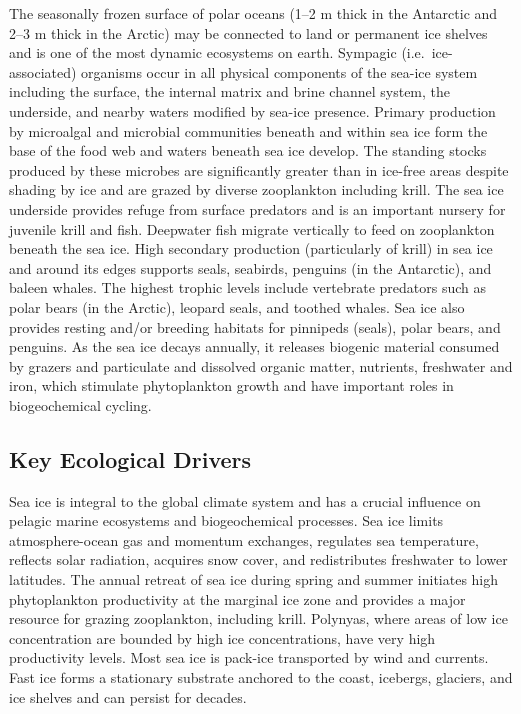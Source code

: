 \documentclass[
  letterpaper,
  DIV=11,
  numbers=noendperiod]{scrartcl}
\begin{document}
The seasonally frozen surface of polar oceans (1--2 m thick in the
Antarctic and 2--3 m thick in the Arctic) may be connected to land or
permanent ice shelves and is one of the most dynamic ecosystems on
earth. Sympagic (i.e.~ice-associated) organisms occur in all physical
components of the sea-ice system including the surface, the internal
matrix and brine channel system, the underside, and nearby waters
modified by sea-ice presence. Primary production by microalgal and
microbial communities beneath and within sea ice form the base of the
food web and waters beneath sea ice develop. The standing stocks
produced by these microbes are significantly greater than in ice-free
areas despite shading by ice and are grazed by diverse zooplankton
including krill. The sea ice underside provides refuge from surface
predators and is an important nursery for juvenile krill and fish.
Deepwater fish migrate vertically to feed on zooplankton beneath the sea
ice. High secondary production (particularly of krill) in sea ice and
around its edges supports seals, seabirds, penguins (in the Antarctic),
and baleen whales. The highest trophic levels include vertebrate
predators such as polar bears (in the Arctic), leopard seals, and
toothed whales. Sea ice also provides resting and/or breeding habitats
for pinnipeds (seals), polar bears, and penguins. As the sea ice decays
annually, it releases biogenic material consumed by grazers and
particulate and dissolved organic matter, nutrients, freshwater and
iron, which stimulate phytoplankton growth and have important roles in
biogeochemical cycling.

\subsection{Key Ecological Drivers}\label{key-ecological-drivers-39}

Sea ice is integral to the global climate system and has a crucial
influence on pelagic marine ecosystems and biogeochemical processes. Sea
ice limits atmosphere-ocean gas and momentum exchanges, regulates sea
temperature, reflects solar radiation, acquires snow cover, and
redistributes freshwater to lower latitudes. The annual retreat of sea
ice during spring and summer initiates high phytoplankton productivity
at the marginal ice zone and provides a major resource for grazing
zooplankton, including krill. Polynyas, where areas of low ice
concentration are bounded by high ice concentrations, have very high
productivity levels. Most sea ice is pack-ice transported by wind and
currents. Fast ice forms a stationary substrate anchored to the coast,
icebergs, glaciers, and ice shelves and can persist for decades.
\end{document}
